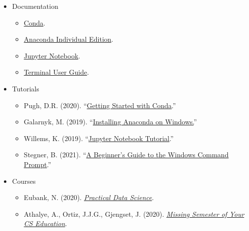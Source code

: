\begin{itemize}[noitemsep,topsep=0pt]
    \item Documentation
        \begin{itemize}[noitemsep,topsep=0pt]
            \item \href{https://docs.conda.io/projects/conda/en/latest/user-guide/index.html}{Conda}.
            \item \href{https://docs.anaconda.com/anaconda/}{Anaconda Individual Edition}.
            \item \href{https://jupyter-notebook.readthedocs.io/en/stable/}{Jupyter Notebook}.
            \item \href{https://support.apple.com/guide/terminal/welcome/mac}{Terminal User Guide}. %
        \end{itemize}
    
    \item Tutorials
        \begin{itemize}[noitemsep,topsep=0pt]
            \item Pugh, D.R. (2020). ``\href{https://towardsdatascience.com/managing-project-specific-environments-with-conda-b8b50aa8be0e}{Getting Started with Conda}.'' %
            \item Galarnyk, M. (2019). ``\href{https://www.datacamp.com/community/tutorials/installing-anaconda-windows}{Installing Anaconda on Windows.}'' %
            \item Willems, K. (2019). ``\href{https://www.datacamp.com/community/tutorials/tutorial-jupyter-notebook}{Jupyter Notebook Tutorial}.'' %
            \item Stegner, B. (2021). ``\href{https://www.makeuseof.com/tag/a-beginners-guide-to-the-windows-command-line/}{A Beginner's Guide to the Windows Command Prompt}.''
        \end{itemize}
        
    \item Courses
        \begin{itemize}[noitemsep,topsep=0pt]
            \item Eubank, N. (2020).
            \textit{\href{https://www.practicaldatascience.org/html/index.html}{Practical Data Science}}.
            \item Athalye, A., Ortiz, J.J.G., Gjengset, J. (2020). \textit{\href{https://missing.csail.mit.edu/}{Missing Semester of Your CS Education}}.
        \end{itemize}
\end{itemize}
